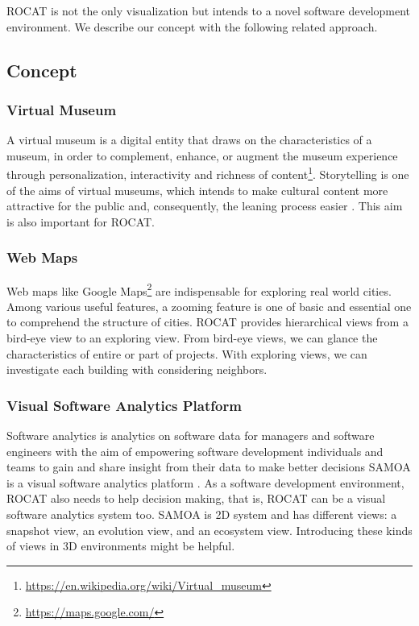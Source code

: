 \documentclass[conference]{IEEEtran}
\begin{document}
ROCAT is not the only visualization but intends to a novel software development environment.
We describe our concept with the following related approach.


\subsection{Concept}
\subsubsection{Virtual Museum}
A virtual museum is a digital entity that draws on the characteristics of a museum, in order to complement, enhance, or augment the museum
experience through personalization, interactivity and richness of content\footnote{\url{https://en.wikipedia.org/wiki/Virtual_museum}}.
Storytelling is one of the aims of virtual museums, which intends to make cultural content more attractive for the public and, consequently, the leaning process easier \cite{Pietroni:2014:IVR:2635823.2611375}.
This aim is also important for ROCAT.

\subsubsection{Web Maps}
Web maps like Google Maps\footnote{\url{https://maps.google.com/}} are indispensable for exploring real world cities.
Among various useful features, a zooming feature is one of basic and essential one to comprehend the structure of cities.
ROCAT provides hierarchical views from a bird-eye view to an exploring view.
From bird-eye views, we can glance the characteristics of entire or part of projects.
With exploring views, we can investigate each building with considering neighbors.

\subsubsection{Visual Software Analytics Platform}
Software analytics is analytics on software data for managers and software engineers with the aim of empowering software development individuals and teams to gain and share insight from their data to make better decisions \cite{Menzies:2013:SAS:2553351.2553360} SAMOA is a visual software analytics platform \cite{6676936}.
As a software development environment, ROCAT also needs to help decision making, that is, ROCAT can be a visual software analytics system too.
SAMOA is 2D system and has different views: a snapshot view, an evolution view, and an ecosystem view.
Introducing these kinds of views in 3D environments might be helpful.
\end{document}
